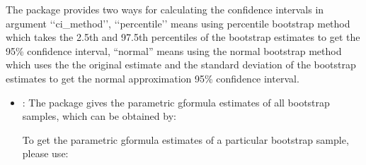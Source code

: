 \documentclass[letterpaper,10pt,english]{sphinxmanual}
\begin{document}
\sphinxAtStartPar
The package provides two ways for calculating the confidence intervals
in argument ‘‘ci\_method’’, ‘‘percentile’’ means using percentile bootstrap method which takes the 2.5th and 97.5th percentiles of the bootstrap estimates to get the 95\% confidence interval,
“normal” means using the normal bootstrap method which uses the the original estimate and
the standard deviation of the bootstrap estimates to get the normal approximation 95\% confidence interval.
\begin{itemize}
\item {} 
\sphinxAtStartPar
{}: The package gives the parametric g\sphinxhyphen{}formula estimates of all
bootstrap samples, which can be obtained by:
\begin{quote}

\begin{sphinxVerbatim}[commandchars=\\\{\}]
           
  \PYG{p}{[}\PYG{p}{]}
\end{sphinxVerbatim}
\end{quote}

\sphinxAtStartPar
To get the parametric g\sphinxhyphen{}formula estimates of a particular bootstrap sample, please use:
\begin{quote}

\begin{sphinxVerbatim}[commandchars=\\\{\}]
\PYG{p}{[}\PYG{p}{]}\PYG{p}{[}\PYG{p}{]}
\end{sphinxVerbatim}
\end{quote}


\end{itemize}
\end{document}
